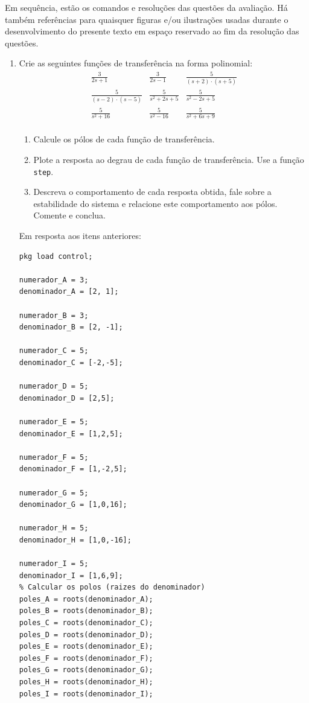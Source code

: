 \documentclass[a4paper,12pt]{article}
\begin{document}
    Em sequência, estão os comandos e resoluções das questões da avaliação.
    Há também referências para quaisquer figuras e/ou ilustrações usadas durante o desenvolvimento do presente texto em
    espaço reservado ao fim da resolução das questões.
    \begin{enumerate}
        \item Crie as seguintes funções de transferência na forma polinomial:
        \[
            \begin{array}{ccc}
                \frac{3}{2s + 1} & \frac{3}{2s - 1} & \frac{5}{(s + 2) \cdot (s + 5)} \\
                \frac{5}{(s - 2) \cdot (s - 5)} & \frac{5}{s^2 + 2s + 5} & \frac{5}{s^2 - 2s + 5} \\
                \frac{5}{s^2 + 16} & \frac{5}{s^2 - 16} & \frac{5}{s^2 + 6s + 9} \\
            \end{array}
        \]

        \begin{enumerate}
            \item Calcule os pólos de cada função de transferência.
            \item Plote a resposta ao degrau de cada função de transferência. Use a função \texttt{step}.
            \item Descreva o comportamento de cada resposta obtida, fale sobre a estabilidade do sistema e relacione este comportamento aos pólos. Comente e conclua.
        \end{enumerate}
        Em resposta aos itens anteriores:
        \vspace{0.5cm}
        \begin{lstlisting}
pkg load control;

numerador_A = 3;
denominador_A = [2, 1];

numerador_B = 3;
denominador_B = [2, -1];

numerador_C = 5;
denominador_C = [-2,-5];

numerador_D = 5;
denominador_D = [2,5];

numerador_E = 5;
denominador_E = [1,2,5];

numerador_F = 5;
denominador_F = [1,-2,5];

numerador_G = 5;
denominador_G = [1,0,16];

numerador_H = 5;
denominador_H = [1,0,-16];

numerador_I = 5;
denominador_I = [1,6,9];
% Calcular os polos (raizes do denominador)
poles_A = roots(denominador_A);
poles_B = roots(denominador_B);
poles_C = roots(denominador_C);
poles_D = roots(denominador_D);
poles_E = roots(denominador_E);
poles_F = roots(denominador_F);
poles_G = roots(denominador_G);
poles_H = roots(denominador_H);
poles_I = roots(denominador_I);


\end{lstlisting}
\end{enumerate}
\end{document}

